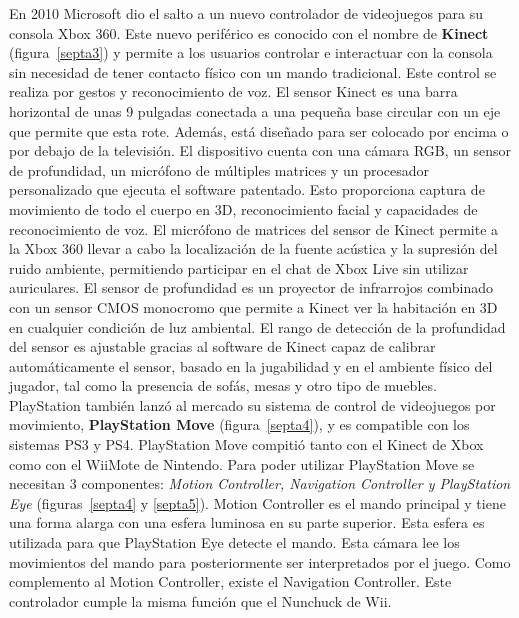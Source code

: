 En 2010 Microsoft dio el salto a un nuevo controlador de videojuegos para su consola Xbox 360. Este nuevo perif\'erico es conocido con el nombre de \textbf{Kinect} (figura~\ref{septa3}) y permite a los usuarios controlar e interactuar con la consola sin necesidad de tener contacto f\'isico con un mando tradicional. Este control se realiza por gestos y reconocimiento de voz. El sensor Kinect es una barra horizontal de unas 9 pulgadas conectada a una peque\~na base circular con un eje que permite que esta rote. Adem\'as, est\'a dise\~nado para ser colocado por encima o por debajo de la televisi\'on. El dispositivo cuenta con una c\'amara RGB, un sensor de profundidad, un micr\'ofono de m\'ultiples matrices y un procesador personalizado que ejecuta el software patentado. Esto proporciona captura de movimiento de todo el cuerpo en 3D, reconocimiento facial y capacidades de reconocimiento de voz. El micr\'ofono de matrices del sensor de Kinect permite a la Xbox 360 llevar a cabo la localizaci\'on de la fuente ac\'ustica y la supresi\'on del ruido ambiente, permitiendo participar en el chat de Xbox Live sin utilizar auriculares. El sensor de profundidad es un proyector de infrarrojos combinado con un sensor CMOS monocromo que permite a Kinect ver la habitaci\'on en 3D en cualquier condici\'on de luz ambiental. El rango de detecci\'on de la profundidad del sensor es ajustable gracias al software de Kinect capaz de calibrar autom\'aticamente el sensor, basado en la jugabilidad y en el ambiente f\'isico del jugador, tal como la presencia de sof\'as, mesas y otro tipo de muebles.\\

PlayStation tambi\'en lanz\'o al mercado su sistema de control de videojuegos por movimiento, \textbf{PlayStation Move} (figura~\ref{septa4}), y es compatible con los sistemas PS3 y PS4. PlayStation Move compiti\'o tanto con el Kinect de Xbox como con el WiiMote de Nintendo. Para poder utilizar PlayStation Move se necesitan 3 componentes: \textit{Motion Controller, Navigation Controller y PlayStation Eye} (figuras~\ref{septa4} y \ref{septa5}). Motion Controller es el mando principal y tiene una forma alarga con una esfera luminosa en su parte superior. Esta esfera es utilizada para que PlayStation Eye detecte el mando. Esta c\'amara lee los movimientos del mando para posteriormente ser interpretados por el juego. Como complemento al Motion Controller, existe el Navigation Controller. Este controlador cumple la misma funci\'on que el Nunchuck de Wii. \\

